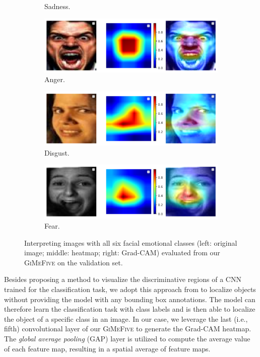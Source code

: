 \begin{figure}[ht]
\begin{subfigure}{0.47\linewidth}
    \caption{Sadness.}
    \label{fig:xai3}
  \end{subfigure}
  \hfill
  \begin{subfigure}{0.47\linewidth}
    \includegraphics[width=\linewidth]{xai_anger.png}
    \caption{Anger.}
    \label{fig:xai4}
  \end{subfigure}
  \hfill
  \begin{subfigure}{0.47\linewidth}
    \includegraphics[width=\linewidth]{xai_disgust.png}
    \caption{Disgust.}
    \label{fig:xai5}
  \end{subfigure}
  \hfill
  \begin{subfigure}{0.47\linewidth}
    \includegraphics[width=\linewidth]{xai_fear.png}
    \caption{Fear.}
    \label{fig:xai6}
  \end{subfigure}
  \caption{Interpreting images with all six facial emotional classes (left: original image; middle: heatmap; right: Grad-CAM) evaluated from our \textsc{GiMeFive} on the validation set.}
  \label{fig:xai}
\end{figure}

Besides proposing a method to visualize the discriminative regions of a CNN trained for the classification task, 
we adopt this approach from \citet{ZhouKLOT16} to localize objects without providing the model with any bounding box annotations. 
The model can therefore learn the classification task with class labels and is then able to localize the object of a specific class in an image. 
In our case, we leverage the last (i.e., fifth) convolutional layer of our \textsc{GiMeFive} to generate the Grad-CAM heatmap. 
The \textit{global average pooling} 
(GAP) layer is utilized to compute the average value of each feature map, 
resulting in a spatial average of feature maps.

